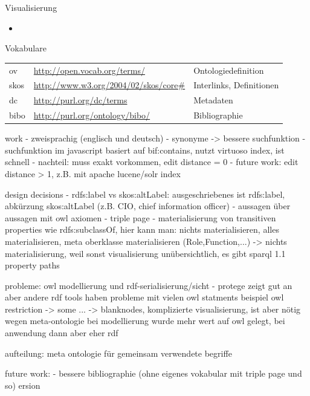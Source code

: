 \documentclass[14pt,aspectratio=1610]{beamer}
\begin{document}
\begin{frame}{Visualisierung}
\begin{block}{}
\begin{itemize}
\item 
\end{itemize}
\end{block}
\end{frame}

\begin{frame}{Vokabulare}
\small
\begin{tabular}{lll}
ov		&\url{http://open.vocab.org/terms/}		&Ontologiedefinition\\
skos		&\url{http://www.w3.org/2004/02/skos/core\#}	&Interlinks, Definitionen\\
dc		&\url{http://purl.org/dc/terms}			&Metadaten\\
bibo		&\url{http://purl.org/ontology/bibo/}		&Bibliographie\\
\end{tabular}
\end{frame}

work
- zweisprachig (englisch und deutsch)
- synonyme -> bessere suchfunktion
- suchfunktion im javascript basiert auf bif:contains, nutzt virtuoso index, ist schnell
- nachteil: muss exakt vorkommen, edit distance = 0
- future work: edit distance > 1, z.B. mit apache lucene/solr index


design decisions
- rdfs:label vs skos:altLabel: ausgeschriebenes ist rdfs:label, abkürzung skos:altLabel (z.B. CIO, chief information officer)
- aussagen über aussagen mit owl axiomen
- triple page
- materialisierung von transitiven properties wie rdfs:subclassOf, hier kann man: nichts materialisieren, alles materialisieren, meta oberklasse materialisieren (Role,Function,...)
-> nichts materialisierung, weil sonst visualisierung unübersichtlich, es gibt sparql 1.1 property paths


probleme:
owl modellierung und rdf-serialisierung/sicht
- protege zeigt gut an aber andere rdf tools haben probleme mit vielen owl statments
beispiel owl restriction -> some ... -> blanknodes, komplizierte visualisierung, ist aber nötig wegen meta-ontologie
bei modellierung wurde mehr wert auf owl gelegt, bei anwendung dann aber eher rdf

aufteilung:
meta ontologie für gemeinsam verwendete begriffe


future work:
- bessere bibliographie (ohne eigenes vokabular mit triple page und so)
ersion
\end{document}
